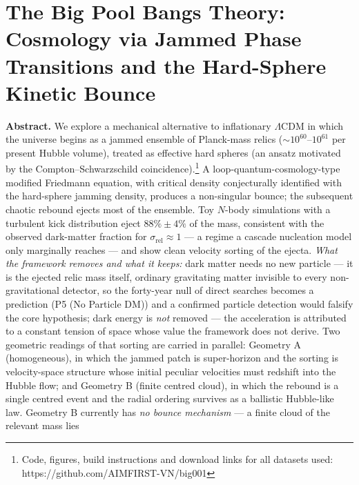 \documentclass[
]{article}
\author{}
\date{}
\begin{document}
\hypertarget{the-big-pool-bangs-theory-cosmology-via-jammed-phase-transitions-and-the-hard-sphere-kinetic-bounce}{%
\section{\texorpdfstring{\textbf{The Big Pool Bangs Theory: Cosmology
via Jammed Phase Transitions and the Hard-Sphere Kinetic
Bounce}}{The Big Pool Bangs Theory: Cosmology via Jammed Phase Transitions and the Hard-Sphere Kinetic Bounce}}\label{the-big-pool-bangs-theory-cosmology-via-jammed-phase-transitions-and-the-hard-sphere-kinetic-bounce}}

\textbf{Abstract.} We explore a mechanical alternative to inflationary
\(\Lambda\)CDM in which the universe begins as a jammed ensemble of
Planck-mass relics (\(\sim\!10^{60}\)--\(10^{61}\) per present Hubble
volume), treated as effective hard spheres (an ansatz motivated by the
Compton--Schwarzschild coincidence).\footnote{Code, figures, build
  instructions and download links for all datasets used:
  https://github.com/AIMFIRST-VN/big001} A loop-quantum-cosmology-type
modified Friedmann equation, with critical density conjecturally
identified with the hard-sphere jamming density, produces a non-singular
bounce; the subsequent chaotic rebound ejects most of the ensemble. Toy
\(N\)-body simulations with a turbulent kick distribution eject
\(88\% \pm 4\%\) of the mass, consistent with the observed dark-matter
fraction for \(\sigma_{\text{rel}} \approx 1\) --- a regime a cascade
nucleation model only marginally reaches --- and show clean velocity
sorting of the ejecta. \emph{What the framework removes and what it
keeps:} dark matter needs no new particle --- it is the ejected relic
mass itself, ordinary gravitating matter invisible to every
non-gravitational detector, so the forty-year null of direct searches
becomes a prediction (P5 (No Particle DM)) and a confirmed particle
detection would falsify the core hypothesis; dark energy is \emph{not}
removed --- the acceleration is attributed to a constant tension of
space whose value the framework does not derive. Two geometric readings
of that sorting are carried in parallel: Geometry A (homogeneous), in
which the jammed patch is super-horizon and the sorting is
velocity-space structure whose initial peculiar velocities must redshift
into the Hubble flow; and Geometry B (finite centred cloud), in which
the rebound is a single centred event and the radial ordering survives
as a ballistic Hubble-like law. Geometry B currently has \emph{no bounce
mechanism} --- a finite cloud of the relevant mass lies
\end{document}
